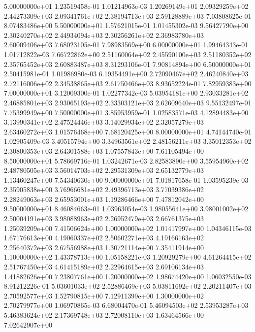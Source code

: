 \documentclass{article}
\begin{document}
\begin{center}
{   5.00000000e+01   1.23519458e-01   1.01214963e-03   1.20269149e+01   2.09329259e+02   2.44273309e+03   2.09341761e+02   2.38194713e+03   2.59128889e+03   7.03808625e-01   8.07483486e+00
   5.50000000e+01   1.57621015e-01   1.01455302e-03   9.56427790e+00   2.30240270e+02   2.44934094e+03   2.30256261e+02   2.36983780e+03   2.60009406e+03   7.68023105e-01   7.98983569e+00
   6.00000000e+01   1.99464343e-01   1.01712822e-03   7.66722862e+00   2.51160064e+02   2.45590100e+03   2.51180352e+02   2.35765452e+03   2.60883487e+03   8.31293106e-01   7.90814894e+00
   6.50000000e+01   2.50415981e-01   1.01986980e-03   6.19354491e+00   2.72090467e+02   2.46240840e+03   2.72116006e+02   2.34538865e+03   2.61750466e+03   8.93652224e-01   7.82959383e+00
   7.00000000e+01   3.12009300e-01   1.02277342e-03   5.03954181e+00   2.93033281e+02   2.46885801e+03   2.93065193e+02   2.33303121e+03   2.62609640e+03   9.55132497e-01   7.75399949e+00
   7.50000000e+01   3.85953959e-01   1.02583571e-03   4.12894483e+00   3.13990341e+02   2.47524446e+03   3.14029934e+02   2.32057279e+03   2.63460272e+03   1.01576468e+00   7.68120425e+00
   8.00000000e+01   4.74144740e-01   1.02905409e-03   3.40515794e+00   3.34963561e+02   2.48156211e+03   3.35012353e+02   2.30800353e+03   2.64301588e+03   1.07557843e+00   7.61105494e+00
   8.50000000e+01   5.78669716e-01   1.03242671e-03   2.82583890e+00   3.55954960e+02   2.48780505e+03   3.56014703e+02   2.29531309e+03   2.65132779e+03   1.13460247e+00   7.54340630e+00
   9.00000000e+01   7.01817658e-01   1.03595239e-03   2.35905838e+00   3.76966681e+02   2.49396713e+03   3.77039386e+02   2.28249063e+03   2.65953001e+03   1.19286466e+00   7.47812042e+00
   9.50000000e+01   8.46084663e-01   1.03963054e-03   1.98055641e+00   3.98001002e+02   2.50004191e+03   3.98088963e+02   2.26952479e+03   2.66761375e+03   1.25039209e+00   7.41506624e+00
   1.00000000e+02   1.01417997e+00   1.04346115e-03   1.67176613e+00   4.19060337e+02   2.50602271e+03   4.19166163e+02   2.25640372e+03   2.67556988e+03   1.30721114e+00   7.35411914e+00
   1.10000000e+02   1.43378713e+00   1.05158221e-03   1.20929279e+00   4.61264415e+02   2.51767450e+03   4.61415189e+02   2.22964615e+03   2.69106134e+03   1.41882626e+00   7.23807761e+00
   1.20000000e+02   1.98674420e+00   1.06032550e-03   8.91212226e-01   5.03601033e+02   2.52886469e+03   5.03811692e+02   2.20211407e+03   2.70592577e+03   1.52790815e+00   7.12911399e+00
   1.30000000e+02   2.70279977e+00   1.06970865e-03   6.68004470e-01   5.46094503e+02   2.53953287e+03   5.46383624e+02   2.17369748e+03   2.72008110e+03   1.63464566e+00   7.02642907e+00
}
\end{center}
\end{document}
